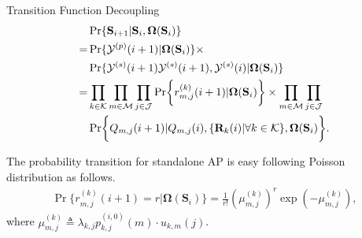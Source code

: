 \documentclass[10pt, conference, letterpaper]{IEEEtran}
\newcommand{\define}{\triangleq}
\renewcommand{\vec}{\mathbf}
\DeclarePairedDelimiter{\set}{\{}{\}}
\DeclarePairedDelimiter{\Brace}{\bigg\{}{\bigg\}}
\newcommand{\apSet}{\mathcal{K}}
\newcommand{\esSet}{\mathcal{M}}
\newcommand{\jSpace}{\mathcal{J}}
\newcommand{\Stat}{\mathbf{S}}
\newcommand{\Obsv}{\mathcal{Y}}
\newcommand{\Policy}{\boldsymbol{\Omega}}
\newcommand{\BPolicy}{\Policy} %
\begin{document}
    \appendices

    \begin{section}{Transition Function Decoupling}
        \label{trans-decouple}
        \begin{align}
            & \Pr\{\Stat_{i+1}|\Stat_{i}, \BPolicy(\Stat_{i})\}
            \nonumber\\
            =& \Pr\{\Obsv^{(p)}(i+1)|\BPolicy(\Stat_{i})\} \times
                \nonumber\\
                &\Pr\{\Obsv^{(s)}(i+1)\Obsv^{(s)}(i+1), \Obsv^{(s)}(i)|\BPolicy(\Stat_{i})\}
            \nonumber\\
            =& \prod_{k\in\apSet}\prod_{m\in\esSet}\prod_{j\in\jSpace}
                    \Pr\Brace{r^{(k)}_{m,j}(i+1)|\BPolicy(\Stat_{i})}
                    \times \prod_{m\in\esSet}\prod_{j\in\jSpace}
                \nonumber\\
                & \Pr\Brace{Q_{m,j}(i+1)|Q_{m,j}(i), \set{\vec{R}_k(i)|\forall k\in\apSet}, \BPolicy(\Stat_{i})}.
        \end{align}
        
        The probability transition for standalone AP is easy following Poisson distribution as follows.
        \begin{align}
            \Pr\{r^{(k)}_{m,j}(i+1)=r|\BPolicy(\Stat_{i})\} = \frac{1}{r!}(\mu^{(k)}_{m,j})^r \exp(-\mu^{(k)}_{m,j}),
        \end{align}
        where $\mu^{(k)}_{m,j} \define \lambda_{k,j} p^{(i,0)}_{k,j}(m) \cdot u_{k,m}(j)$.
        

\end{section}
\end{document}
